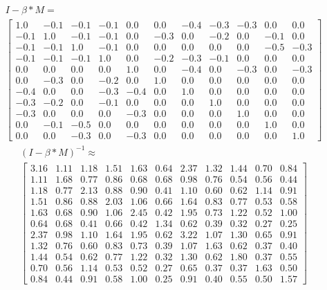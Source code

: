 \begin{gather}
	\nonumber I - \beta * M = \\
	\begin{bmatrix}
		1.0 & -0.1 & -0.1 & -0.1 & 0.0 & 0.0 & -0.4 & -0.3 & -0.3 & 0.0 & 0.0\\
		-0.1 & 1.0 & -0.1 & -0.1 & 0.0 & -0.3 & 0.0 & -0.2 & 0.0 & -0.1 & 0.0\\
		-0.1 & -0.1 & 1.0 & -0.1 & 0.0 & 0.0 & 0.0 & 0.0 & 0.0 & -0.5 & -0.3\\
		-0.1 & -0.1 & -0.1 & 1.0 & 0.0 & -0.2 & -0.3 & -0.1 & 0.0 & 0.0 & 0.0\\
		0.0 & 0.0 & 0.0 & 0.0 & 1.0 & 0.0 & -0.4 & 0.0 & -0.3 & 0.0 & -0.3\\
		0.0 & -0.3 & 0.0 & -0.2 & 0.0 & 1.0 & 0.0 & 0.0 & 0.0 & 0.0 & 0.0\\
		-0.4 & 0.0 & 0.0 & -0.3 & -0.4 & 0.0 & 1.0 & 0.0 & 0.0 & 0.0 & 0.0\\
		-0.3 & -0.2 & 0.0 & -0.1 & 0.0 & 0.0 & 0.0 & 1.0 & 0.0 & 0.0 & 0.0\\
		-0.3 & 0.0 & 0.0 & 0.0 & -0.3 & 0.0 & 0.0 & 0.0 & 1.0 & 0.0 & 0.0\\
		0.0 & -0.1 & -0.5 & 0.0 & 0.0 & 0.0 & 0.0 & 0.0 & 0.0 & 1.0 & 0.0\\
		0.0 & 0.0 & -0.3 & 0.0 & -0.3 & 0.0 & 0.0 & 0.0 & 0.0 & 0.0 & 1.0
	\end{bmatrix}
	\label{frml:katzZentralitaetPseudoMitarbeiter:formel3}
\end{gather}
\begin{gather}
	\nonumber (I - \beta * M)^{-1} \approx\\
	\begin{bmatrix}
		3.16 & 1.11 & 1.18 & 1.51 & 1.63 & 0.64 & 2.37 & 1.32 & 1.44 & 0.70 & 0.84\\
		1.11 & 1.68 & 0.77 & 0.86 & 0.68 & 0.68 & 0.98 & 0.76 & 0.54 & 0.56 & 0.44\\
		1.18 & 0.77 & 2.13 & 0.88 & 0.90 & 0.41 & 1.10 & 0.60 & 0.62 & 1.14 & 0.91\\
		1.51 & 0.86 & 0.88 & 2.03 & 1.06 & 0.66 & 1.64 & 0.83 & 0.77 & 0.53 & 0.58\\
		1.63 & 0.68 & 0.90 & 1.06 & 2.45 & 0.42 & 1.95 & 0.73 & 1.22 & 0.52 & 1.00\\
		0.64 & 0.68 & 0.41 & 0.66 & 0.42 & 1.34 & 0.62 & 0.39 & 0.32 & 0.27 & 0.25\\
		2.37 & 0.98 & 1.10 & 1.64 & 1.95 & 0.62 & 3.22 & 1.07 & 1.30 & 0.65 & 0.91\\
		1.32 & 0.76 & 0.60 & 0.83 & 0.73 & 0.39 & 1.07 & 1.63 & 0.62 & 0.37 & 0.40\\
		1.44 & 0.54 & 0.62 & 0.77 & 1.22 & 0.32 & 1.30 & 0.62 & 1.80 & 0.37 & 0.55\\
		0.70 & 0.56 & 1.14 & 0.53 & 0.52 & 0.27 & 0.65 & 0.37 & 0.37 & 1.63 & 0.50\\
		0.84 & 0.44 & 0.91 & 0.58 & 1.00 & 0.25 & 0.91 & 0.40 & 0.55 & 0.50 & 1.57 
	\end{bmatrix}
	\label{frml:katzZentralitaetPseudoMitarbeiter:formel4}
\end{gather}

